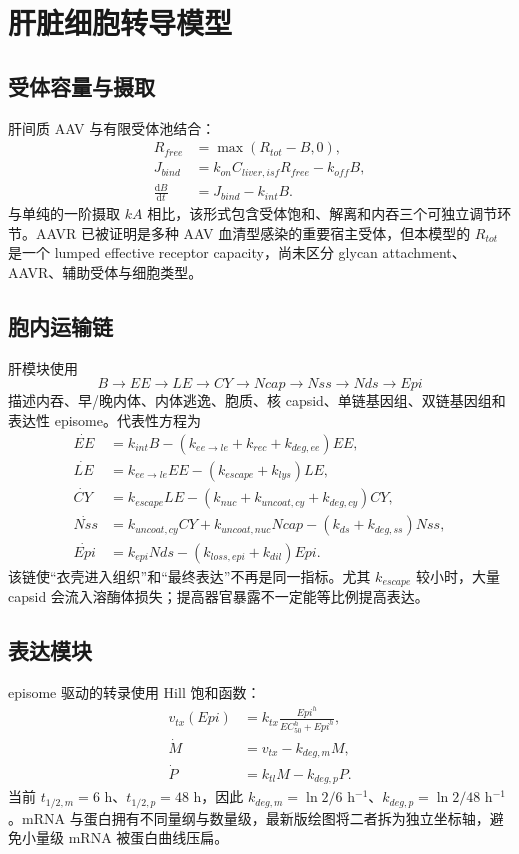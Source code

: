 \documentclass[UTF8,11pt,a4paper]{ctexart}
\newcommand{\dd}{\mathrm{d}}
\begin{document}
\section{肝脏细胞转导模型}

\subsection{受体容量与摄取}
肝间质 AAV 与有限受体池结合：
\begin{align}
R_{free}&=\max(R_{tot}-B,0),\\
J_{bind}&=k_{on}C_{liver,isf}R_{free}-k_{off}B,\\
\frac{\dd B}{\dd t}&=J_{bind}-k_{int}B.
\end{align}
与单纯的一阶摄取 $kA$ 相比，该形式包含受体饱和、解离和内吞三个可独立调节环节。AAVR 已被证明是多种 AAV 血清型感染的重要宿主受体\cite{pillay2016}，但本模型的 $R_{tot}$ 是一个 lumped effective receptor capacity，尚未区分 glycan attachment、AAVR、辅助受体与细胞类型。

\subsection{胞内运输链}
肝模块使用
\[
B\rightarrow EE\rightarrow LE\rightarrow CY\rightarrow Ncap
\rightarrow Nss\rightarrow Nds\rightarrow Epi
\]
描述内吞、早/晚内体、内体逃逸、胞质、核 capsid、单链基因组、双链基因组和表达性 episome。代表性方程为
\begin{align}
\dot{EE}&=k_{int}B-(k_{ee\to le}+k_{rec}+k_{deg,ee})EE,\\
\dot{LE}&=k_{ee\to le}EE-(k_{escape}+k_{lys})LE,\\
\dot{CY}&=k_{escape}LE-(k_{nuc}+k_{uncoat,cy}+k_{deg,cy})CY,\\
\dot{Nss}&=k_{uncoat,cy}CY+k_{uncoat,nuc}Ncap-(k_{ds}+k_{deg,ss})Nss,\\
\dot{Epi}&=k_{epi}Nds-(k_{loss,epi}+k_{dil})Epi.
\end{align}
该链使“衣壳进入组织”和“最终表达”不再是同一指标。尤其 $k_{escape}$ 较小时，大量 capsid 会流入溶酶体损失；提高器官暴露不一定能等比例提高表达\cite{trafficking2012,trafficking2021}。

\subsection{表达模块}
episome 驱动的转录使用 Hill 饱和函数：
\begin{align}
v_{tx}(Epi)&=k_{tx}\frac{Epi^h}{EC_{50}^h+Epi^h},\\
\dot M&=v_{tx}-k_{deg,m}M,\\
\dot P&=k_{tl}M-k_{deg,p}P.
\end{align}
当前 $t_{1/2,m}=6$ h、$t_{1/2,p}=48$ h，因此 $k_{deg,m}=\ln2/6$ h$^{-1}$、$k_{deg,p}=\ln2/48$ h$^{-1}$。mRNA 与蛋白拥有不同量纲与数量级，最新版绘图将二者拆为独立坐标轴，避免小量级 mRNA 被蛋白曲线压扁。
\end{document}
